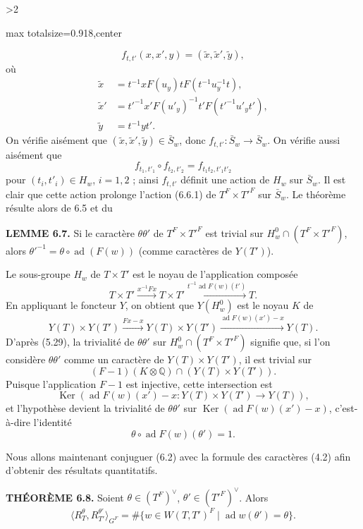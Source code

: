 \documentclass[9pt,twoside]{extarticle}
\newcommand{\EditionPage}[3]{%
  \ifnum#1>2\clearpage\fi
  \pdfbookmark[1]{Printed page #2}{fr-folio-#2}%
  \hypertarget{fr-physical-#1}{}%
  \noindent\begin{adjustbox}{max totalsize={\textwidth}{0.918\textheight},center}
  \begin{minipage}[t]{\textwidth}
  \fontsize{9.4}{11.1}\selectfont\justifying
  #3
  \end{minipage}
  \end{adjustbox}%
}
\begin{document}
\EditionPage{37}{138}{%
\[
f_{t,t'}(x,x',y)=(\widetilde x,\widetilde x',\widetilde y),
\] où \[
\begin{aligned}
\widetilde x&=t^{-1}xF(u_y)tF(t^{-1}u_y^{-1}t),\\
\widetilde x'&=t'^{-1}x'F(u'_y)^{-1}t'F(t'^{-1}u'_yt'),\\
\widetilde y&=t^{-1}yt'.
\end{aligned}
\] On vérifie aisément que \((\widetilde x,\widetilde x',\widetilde y)\in\bar S_w\), donc \(f_{t,t'}:\bar S_w\longrightarrow\bar S_w\). On vérifie aussi aisément que \[
f_{t_1,t'_1}\circ f_{t_2,t'_2}=f_{t_1t_2,t'_1t'_2}
\] pour \((t_i,t'_i)\in H_w\), \(i=1,2\) ; ainsi \(f_{t,t'}\) définit une action de \(H_w\) sur \(\bar S_w\). Il est clair que cette action prolonge l'action (6.6.1) de \(T^F\times T'^F\) sur \(\bar S_w\). Le théorème résulte alors de 6.5 et du\par

\noindent\textbf{LEMME 6.7.} Si le caractère \(\theta\theta'\) de \(T^F\times T'^F\) est trivial sur \(H_w^0\cap(T^F\times T'^F)\), alors \(\theta'^{-1}=\theta\circ\operatorname{ad}(F(w))\) (comme caractères de \(Y(T')\)).\par

Le sous-groupe \(H_w\) de \(T\times T'\) est le noyau de l'application composée \[
T\times T'\xrightarrow{x^{-1}Fx}T\times T'\xrightarrow{t^{-1}\operatorname{ad}F(w)(t')}T.
\] En appliquant le foncteur \(Y\), on obtient que \(Y(H_w^0)\) est le noyau \(K\) de \[
Y(T)\times Y(T')\xrightarrow{Fx-x}Y(T)\times Y(T')\xrightarrow{\operatorname{ad}F(w)(x')-x}Y(T).
\] D'après (5.29), la trivialité de \(\theta\theta'\) sur \(H_w^0\cap(T^F\times T'^F)\) signifie que, si l'on considère \(\theta\theta'\) comme un caractère de \(Y(T)\times Y(T')\), il est trivial sur \[
(F-1)(K\otimes\mathbb Q)\cap(Y(T)\times Y(T')).
\] Puisque l'application \(F-1\) est injective, cette intersection est \[
\operatorname{Ker}(\operatorname{ad}F(w)(x')-x:Y(T)\times Y(T')\longrightarrow Y(T)),
\] et l'hypothèse devient la trivialité de \(\theta\theta'\) sur \(\operatorname{Ker}(\operatorname{ad}F(w)(x')-x)\), c'est-à-dire l'identité \[
\theta\circ\operatorname{ad}F(w)(\theta')=1.
\]\par

Nous allons maintenant conjuguer (6.2) avec la formule des caractères (4.2) afin d'obtenir des résultats quantitatifs.\par

\noindent\textbf{THÉORÈME 6.8.} Soient \(\theta\in(T^F)^\vee\), \(\theta'\in(T'^F)^\vee\). Alors \[
\langle R_T^\theta,R_{T'}^{\theta'}\rangle_{G^F}
=
\#\{w\in W(T,T')^F\mid \operatorname{ad}w(\theta')=\theta\}.
\]\par

}
\end{document}
